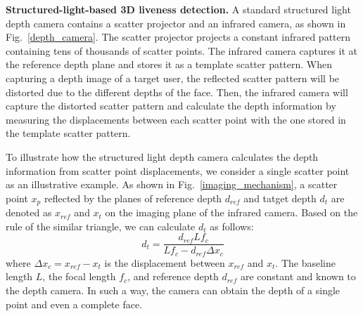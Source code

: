 \textbf{Structured-light-based 3D liveness detection.} A standard structured light depth camera contains a scatter projector and an infrared camera, as shown in Fig.~\ref{depth_camera}. The scatter projector projects a  constant infrared pattern containing tens of thousands of scatter points. The infrared camera captures it at the reference depth plane and stores it as a template scatter pattern. 
When capturing a depth image of a target user, the reflected scatter pattern will be distorted due to the different depths of the face. Then, the infrared camera will capture the distorted scatter pattern and calculate the depth information by measuring the displacements between each scatter point with the one stored in the template scatter pattern.

To illustrate how the structured light depth camera calculates the depth information from scatter point displacements, we consider a single scatter point as an illustrative example.
As shown in Fig.~\ref{imaging_mechanism}, a scatter point $x_p$ reflected by the planes of  reference depth $d_{ref}$ and tatget depth $d_t$ are denoted as $x_{ref}$ and $x_{t}$ on the imaging plane of the infrared camera.
Based on the rule of the similar triangle, we can calculate $d_t$ as follows:
\begin{equation}
	d_t= \frac{d_{ref}Lf_c}{Lf_c - d_{ref}\Delta x_c}
	\label{d_cal}
\end{equation}
where $\Delta x_c=x_{ref}-x_{t}$ is the displacement between $x_{ref}$ and $x_{t}$. The baseline length $L$, the focal length $f_c$, and reference depth $d_{ref}$ are constant and known to the depth camera. In such a way, the camera can obtain the depth of a single point and even a complete face.

